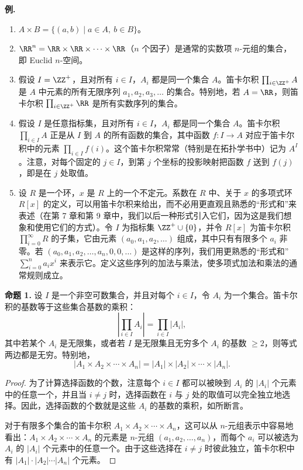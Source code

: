 \noindent\textbf{例.}
\begin{enumerate}[label=(\arabic*)]
  \item $A\times B=\{(a,b)\mid a\in A,\ b\in B\}$。

  \item $\RR^n=\RR\times\RR\times\cdots\times\RR$（$n$ 个因子）是通常的实数项 $n$-元组的集合，即 Euclid $n$-空间。

  \item 假设 $I=\ZZ^+$，且对所有 $i\in I$，$A_i$ 都是同一个集合 $A$。笛卡尔积 $\prod_{i\in\ZZ^+}A$ 是 $A$ 中元素的所有无限序列 $a_1,a_2,a_3,\ldots$ 的集合。特别地，若 $A=\RR$，则笛卡尔积 $\prod_{i\in\ZZ^+}\RR$ 是所有实数序列的集合。

  \item 假设 $I$ 是任意指标集，且对所有 $i\in I$，$A_i$ 都是同一个集合 $A$。笛卡尔积 $\prod_{i\in I}A$ 正是从 $I$ 到 $A$ 的所有函数的集合，其中函数 $f:I\to A$ 对应于笛卡尔积中的元素 $\prod_{i\in I}f(i)$。这个笛卡尔积常常（特别是在拓扑学书中）记为 $A^I$。注意，对每个固定的 $j\in I$，到第 $j$ 个坐标的投影映射把函数 $f$ 送到 $f(j)$，即是在 $j$ 处取值。

  \item 设 $R$ 是一个环，$x$ 是 $R$ 上的一个不定元。系数在 $R$ 中、关于 $x$ 的多项式环 $R[x]$ 的定义，可以用笛卡尔积来给出，而不必用更直观且熟悉的“形式和”来表述（在第 7 章和第 9 章中，我们以后一种形式引入它们，因为这是我们想象和使用它们的方式）。令 $I$ 为指标集 $\ZZ^+\cup\{0\}$，并令 $R[x]$ 为笛卡尔积 $\prod_{i=0}^{\infty}R$ 的子集，它由元素 $(a_0,a_1,a_2,\ldots)$ 组成，其中只有有限多个 $a_i$ 非零。若 $(a_0,a_1,a_2,\ldots,a_n,0,0,\ldots)$ 是这样的序列，我们用更熟悉的“形式和” $\sum_{i=0}^n a_ix^i$ 来表示它。定义这些序列的加法与乘法，使多项式加法和乘法的通常规则成立。
\end{enumerate}

\medskip
\noindent\textbf{命题 1.} 设 $I$ 是一个非空可数集合，并且对每个 $i\in I$，令 $A_i$ 为一个集合。笛卡尔积的基数等于这些集合基数的乘积：
\[
  \left|\prod_{i\in I}A_i\right|=\prod_{i\in I}\lvert A_i\rvert,
\]
其中若某个 $A_i$ 是无限集，或者若 $I$ 是无限集且无穷多个 $A_i$ 的基数 $\geq 2$，则等式两边都是无穷。特别地，
\[
  \lvert A_1\times A_2\times\cdots\times A_n\rvert
  =\lvert A_1\rvert\times\lvert A_2\rvert\times\cdots\times\lvert A_n\rvert.
\]

\begin{proof}
为了计算选择函数的个数，注意每个 $i\in I$ 都可以被映到 $A_i$ 的 $\lvert A_i\rvert$ 个元素中的任意一个，并且当 $i\neq j$ 时，选择函数在 $i$ 与 $j$ 处的取值可以完全独立地选择。因此，选择函数的个数就是这些 $A_i$ 的基数的乘积，如所断言。

对于有限多个集合的笛卡尔积 $A_1\times A_2\times\cdots\times A_n$，这可以从 $n$-元组表示中容易地看出：$A_1\times A_2\times\cdots\times A_n$ 的元素是 $n$-元组 $(a_1,a_2,\ldots,a_n)$，而每个 $a_i$ 可以被选为 $A_i$ 的 $\lvert A_i\rvert$ 个元素中的任意一个。由于这些选择在 $i\neq j$ 时彼此独立，笛卡尔积中有 $\lvert A_1\rvert\cdot\lvert A_2\rvert\cdots\lvert A_n\rvert$ 个元素。
\end{proof}


